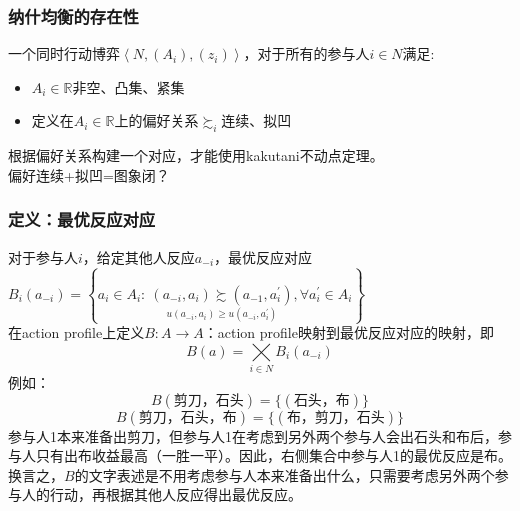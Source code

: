 \documentclass{beamer}
\begin{document}
\begin{frame}[label=NEexist]
	\frametitle{纳什均衡的存在性}
	\begin{definition}[纳什均衡存在]
		\fangsong
		一个同时行动博弈$\left\langle N,\left(A_{i}\right),\left(z_{i}\right)\right\rangle$，对于所有的参与人$i\in N$满足:\\
		\begin{itemize}
			\item[1] $A_{i}\in \mathbb{R}$非空、凸集、紧集
			\item[2] 定义在$A_{i}\in \mathbb{R}$上的偏好关系$\succsim_{i}$连续、拟凹
		\end{itemize}
	\end{definition}

	根据偏好关系构建一个对应，才能使用kakutani不动点定理。\\
	偏好连续+拟凹=图象闭？
\end{frame}
\begin{frame}[label = best_response_correspondence]
	\frametitle{定义：最优反应对应}
	对于参与人$i$，给定其他人反应$a_{-i}$，最优反应对应$B_{i}\left(a_{-i}\right)=\left\lbrace a_{i}\in A_{i}:\ \underset{u\left(a_{-i},a_{i}\right)\geq u\left(a_{-i},a_{i}^{'}\right)}{\left(a_{-i},a_{i}\right)\succsim\left(a_{-1},a_{i}^{'}\right)} ,\forall a_{i}^{'}\in A_{i}\right\rbrace $\\
	在action profile上定义$B:A\to A$：action profile映射到最优反应对应的映射，即
	$$B\left(a\right)=\bigtimes\limits_{i\in N} B_{i}\left(a_{-i}\right)$$
	例如：
	$$B\left(\text{剪刀，石头}\right)=\{\left(\text{石头，布}\right)\}$$
	$$B\left(\text{剪刀，石头，布}\right)=\{\left(\text{布，剪刀，石头}\right)\}$$
	参与人1本来准备出剪刀，但参与人1在考虑到另外两个参与人会出石头和布后，参与人只有出布收益最高（一胜一平）。因此，右侧集合中参与人1的最优反应是布。\\
	换言之，$B$的文字表述是不用考虑参与人本来准备出什么，只需要考虑另外两个参与人的行动，再根据其他人反应得出最优反应。
\end{frame}
\end{document}
